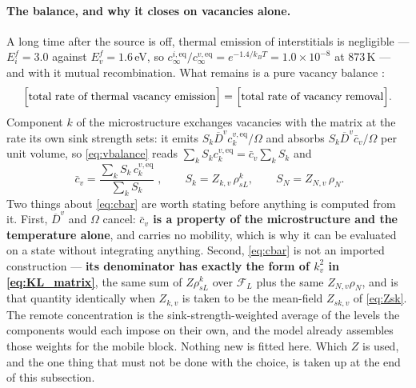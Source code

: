 \documentclass{article}
\begin{document}
\paragraph{The balance, and why it closes on vacancies alone.} A long time after
the source is off, thermal emission of interstitials is negligible --- $E^f_i=3.0$
against $E^f_v=1.6\,$eV, so $c^{i,\mathrm{eq}}_\infty/c^{v,\mathrm{eq}}_\infty
=e^{-1.4/k_BT}=1.0\times10^{-8}$ at $873\,$K --- and with it mutual
recombination. What remains is a pure vacancy balance
\citep{ghoniem_thesis}:
\begin{equation}
  \Bigl[\text{total rate of thermal vacancy emission}\Bigr]
  =\Bigl[\text{total rate of vacancy removal}\Bigr].
  \label{eq:vbalance}
\end{equation}
Component $k$ of the microstructure exchanges vacancies with the matrix at the
rate its own sink strength sets: it emits $S_k\overline D^{v}
c^{v,\mathrm{eq}}_{k}/\Omega$ and absorbs $S_k\overline D^{v}\bar c_v/\Omega$
per unit volume, so \cref{eq:vbalance} reads $\sum_k S_k c^{v,\mathrm{eq}}_{k}
=\bar c_v\sum_k S_k$ and
\begin{equation}
  \boxed{\;
  \bar c_v=\frac{\displaystyle\sum_{k} S_k\,c^{v,\mathrm{eq}}_{k}}
                {\displaystyle\sum_{k} S_k}\;},
  \qquad
  S_k=Z_{k,v}\,\rho^k_{sL},
  \qquad
  S_N=Z_{N,v}\,\rho_N .
  \label{eq:cbar}
\end{equation}
Two things about \cref{eq:cbar} are worth stating before anything is computed
from it. First, $\overline D^{v}$ and $\Omega$ cancel: \textbf{$\bar c_v$ is a
property of the microstructure and the temperature alone}, and carries no
mobility, which is why it can be evaluated on a state without integrating
anything. Second, \cref{eq:cbar} is not an imported construction ---
\textbf{its denominator has exactly the form of $k^2_v$ in \cref{eq:KL_matrix}},
the same sum of $Z\rho^k_{sL}$ over $\mathcal F_L$ plus the same $Z_{N,v}\rho_N$,
and is that quantity identically when $Z_{k,v}$ is taken to be the mean-field
$Z_{sk,v}$ of \cref{eq:Zsk}. The remote concentration is the
sink-strength-weighted average of the levels the components would each impose on
their own, and the model already assembles those weights for the mobile block.
Nothing new is fitted here. Which $Z$ is used, and the one thing that must not be
done with the choice, is taken up at the end of this subsection.
\end{document}
